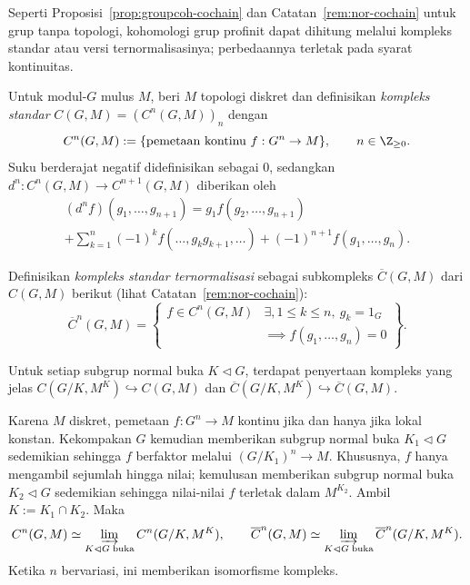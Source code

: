 Seperti Proposisi~\ref{prop:groupcoh-cochain} dan
Catatan~\ref{rem:nor-cochain} untuk grup tanpa topologi, kohomologi grup
profinit dapat dihitung melalui kompleks standar atau versi ternormalisasinya;
perbedaannya terletak pada syarat kontinuitas.

\begin{definition}
	Untuk modul-$G$ mulus $M$, beri $M$ topologi diskret dan definisikan
	\emph{kompleks standar} $C(G,M)=(C^n(G,M))_n$ dengan
	\[ C^n(G,M):=\{\text{pemetaan kontinu }f:G^n\to M\},
	\qquad n\in\Z_{\geq0}. \]
	Suku berderajat negatif didefinisikan sebagai $0$, sedangkan
	$d^n:C^n(G,M)\to C^{n+1}(G,M)$ diberikan oleh
	\begin{multline*}
		(d^nf)(g_1,\ldots,g_{n+1})
		=g_1f(g_2,\ldots,g_{n+1})\\
		+\sum_{k=1}^n(-1)^kf(\ldots,g_kg_{k+1},\ldots)
		+(-1)^{n+1}f(g_1,\ldots,g_n).
	\end{multline*}

	Definisikan \emph{kompleks standar ternormalisasi} sebagai subkompleks
	$\overline{C}(G,M)$ dari $C(G,M)$ berikut
	(lihat Catatan~\ref{rem:nor-cochain}):
	\[ \overline{C}^n(G,M)=\left\{\begin{array}{r|l}
		f\in C^n(G,M)&\exists,1\leq k\leq n,\ g_k=1_G\\
		&\implies f(g_1,\ldots,g_n)=0
	\end{array}\right\}. \]
\end{definition}

Untuk setiap subgrup normal buka $K\lhd G$, terdapat penyertaan kompleks yang
jelas
$C(G/K,M^K)\hookrightarrow C(G,M)$ dan
$\overline{C}(G/K,M^K)\hookrightarrow\overline{C}(G,M)$.

Karena $M$ diskret, pemetaan $f:G^n\to M$ kontinu jika dan hanya jika lokal
konstan. Kekompakan $G$ kemudian memberikan subgrup normal buka
$K_1\lhd G$ sedemikian sehingga $f$ berfaktor melalui
$(G/K_1)^n\to M$. Khususnya, $f$ hanya mengambil sejumlah hingga nilai;
kemulusan memberikan subgrup normal buka $K_2\lhd G$ sedemikian sehingga
nilai-nilai $f$ terletak dalam $M^{K_2}$. Ambil $K:=K_1\cap K_2$. Maka
\[ C^n(G,M)\simeq\varinjlim_{K\lhd G\;\text{buka}}C^n(G/K,M^K),\qquad
	\overline{C}^n(G,M)\simeq
	\varinjlim_{K\lhd G\;\text{buka}}\overline{C}^n(G/K,M^K). \]
Ketika $n$ bervariasi, ini memberikan isomorfisme kompleks.

